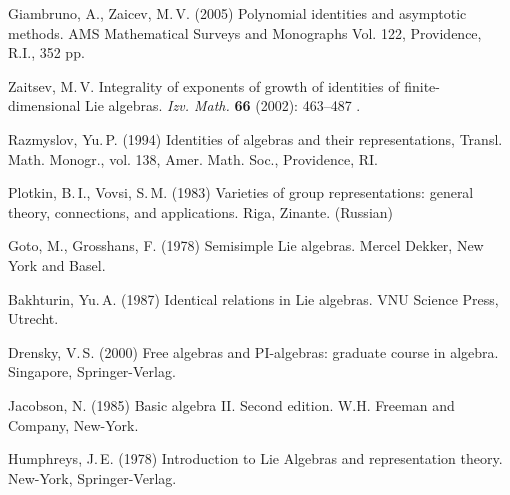 \documentclass[12pt, reqno, a4paper]{amsart}
\theoremstyle{plain}
\theoremstyle{remark}
\theoremstyle{definition}
\begin{document}
\begin{thebibliography}{9}

 Giambruno, A., Zaicev, M.\,V. (2005)
Polynomial identities and asymptotic methods.
AMS Mathematical Surveys and Monographs Vol. 122,
 Providence, R.I., 352 pp.

  Zaitsev, M.\,V. Integrality of exponents
 of growth of identities of finite-dimensional Lie algebras.
 {\itshape Izv. Math.} {\bfseries 66} (2002): 463--487 .

 Razmyslov, Yu.\,P. (1994) Identities of algebras and
their representations, Transl. Math. Monogr., vol. 138, Amer. Math. Soc.,
Providence, RI.

  Plotkin, B.\,I., Vovsi, S.\,M. (1983) Varieties of group representations:
   general theory, connections, and applications.
 Riga, Zinante. (Russian)

 Goto, M., Grosshans, F. (1978)
Semisimple Lie algebras. Mercel Dekker, New York and Basel.

 Bakhturin, Yu.\,A. (1987)
Identical relations in Lie algebras.
VNU Science Press, Utrecht.

   Drensky, V.\,S. (2000)
        Free algebras and PI-algebras: graduate course in algebra.
        Singapore, Springer-Verlag.

   Jacobson, N. (1985)
        Basic algebra II. Second edition.
        W.H. Freeman and Company, New-York.

 Humphreys, J.\,E. (1978) Introduction to Lie Algebras and representation theory.
  New-York, Springer-Verlag.

\end{thebibliography}
\end{document}
